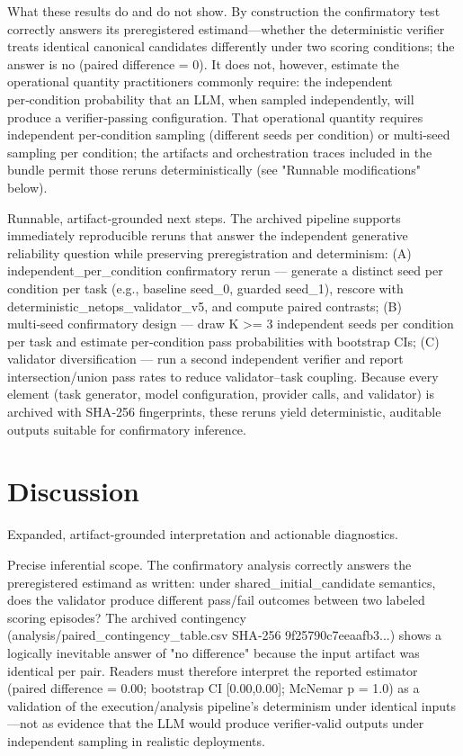 \documentclass[conference]{IEEEtran}
\begin{document}
What these results do and do not show. By construction the confirmatory test correctly answers its preregistered estimand---whether the deterministic verifier treats identical canonical candidates differently under two scoring conditions; the answer is no (paired difference = 0). It does not, however, estimate the operational quantity practitioners commonly require: the independent per‑condition probability that an LLM, when sampled independently, will produce a verifier‑passing configuration. That operational quantity requires independent per‑condition sampling (different seeds per condition) or multi‑seed sampling per condition; the artifacts and orchestration traces included in the bundle permit those reruns deterministically (see "Runnable modifications" below).

Runnable, artifact‑grounded next steps. The archived pipeline supports immediately reproducible reruns that answer the independent generative reliability question while preserving preregistration and determinism: (A) independent\_per\_condition confirmatory rerun --- generate a distinct seed per condition per task (e.g., baseline seed\_0, guarded seed\_1), rescore with deterministic\_netops\_validator\_v5, and compute paired contrasts; (B) multi‑seed confirmatory design --- draw K >= 3 independent seeds per condition per task and estimate per‑condition pass probabilities with bootstrap CIs; (C) validator diversification --- run a second independent verifier and report intersection/union pass rates to reduce validator--task coupling. Because every element (task generator, model configuration, provider calls, and validator) is archived with SHA‑256 fingerprints, these reruns yield deterministic, auditable outputs suitable for confirmatory inference.

\section{Discussion}
Expanded, artifact‑grounded interpretation and actionable diagnostics.

Precise inferential scope. The confirmatory analysis correctly answers the preregistered estimand as written: under shared\_initial\_candidate semantics, does the validator produce different pass/fail outcomes between two labeled scoring episodes? The archived contingency (analysis/paired\_contingency\_table.csv SHA‑256 9f25790c7eeaafb3...) shows a logically inevitable answer of "no difference" because the input artifact was identical per pair. Readers must therefore interpret the reported estimator (paired difference = 0.00; bootstrap CI [0.00,0.00]; McNemar p = 1.0) as a validation of the execution/analysis pipeline's determinism under identical inputs---not as evidence that the LLM would produce verifier‑valid outputs under independent sampling in realistic deployments.
\end{document}

